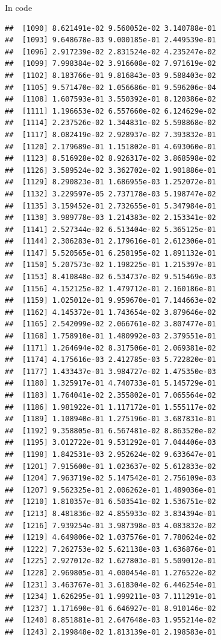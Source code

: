 \documentclass[ignorenonframetext,]{beamer}
\begin{document}
\begin{frame}[fragile]{In code}
\begin{verbatim}
##  [1090] 8.621491e-02 9.560052e-02 3.140788e-01
##  [1093] 9.648678e-03 9.000185e-01 2.449539e-01
##  [1096] 2.917239e-02 2.831524e-02 4.235247e-02
##  [1099] 7.998384e-02 3.916608e-02 7.971619e-02
##  [1102] 8.183766e-01 9.816843e-03 9.588403e-02
##  [1105] 9.571470e-02 1.056686e-01 9.596206e-04
##  [1108] 1.607593e-01 3.550392e-01 8.120386e-02
##  [1111] 1.196653e-02 6.557660e-02 6.124629e-02
##  [1114] 2.237526e-02 1.344831e-02 5.598868e-02
##  [1117] 8.082419e-02 2.928937e-02 7.393832e-01
##  [1120] 2.179689e-01 1.151802e-01 4.693060e-01
##  [1123] 8.516928e-02 8.926317e-02 3.868598e-02
##  [1126] 3.589524e-02 3.362702e-02 1.901886e-01
##  [1129] 8.290823e-01 1.686955e-03 1.252072e-01
##  [1132] 3.229597e-05 2.737178e-03 5.198747e-02
##  [1135] 3.159452e-01 2.732655e-01 5.347984e-01
##  [1138] 3.989778e-03 1.214383e-02 2.153341e-02
##  [1141] 2.527344e-02 6.513404e-02 5.365125e-01
##  [1144] 2.306283e-01 2.179616e-01 2.612306e-01
##  [1147] 5.520565e-01 6.258195e-02 1.891132e-01
##  [1150] 5.207573e-02 1.198225e-01 1.215397e-01
##  [1153] 8.410848e-02 6.534737e-02 9.515469e-03
##  [1156] 4.152125e-02 1.479712e-01 2.160186e-01
##  [1159] 1.025012e-01 9.959670e-01 7.144663e-02
##  [1162] 4.145372e-01 1.743654e-02 3.879646e-02
##  [1165] 2.542099e-02 2.066761e-02 3.807477e-01
##  [1168] 1.758910e-01 1.480992e-03 2.379551e-01
##  [1171] 1.264694e-02 8.317506e-01 2.069381e-02
##  [1174] 4.175616e-03 2.412785e-03 5.722820e-01
##  [1177] 1.433437e-01 3.984727e-02 1.475350e-03
##  [1180] 1.325917e-01 4.740733e-01 5.145729e-01
##  [1183] 1.764041e-02 2.355802e-01 7.065564e-02
##  [1186] 1.981922e-01 1.117172e-01 1.555117e-02
##  [1189] 1.108940e-01 1.275196e-01 3.687831e-01
##  [1192] 9.358805e-01 6.567481e-02 8.863520e-02
##  [1195] 3.012722e-01 9.531292e-01 7.044406e-03
##  [1198] 1.842531e-03 2.952624e-02 9.633647e-01
##  [1201] 7.915600e-01 1.023637e-02 5.612833e-02
##  [1204] 7.963719e-02 5.147542e-01 2.756109e-03
##  [1207] 9.562325e-01 2.006262e-01 1.489036e-01
##  [1210] 1.810357e-01 6.503541e-02 1.536751e-02
##  [1213] 8.481836e-02 4.855933e-02 3.834394e-01
##  [1216] 7.939254e-01 3.987398e-03 4.083832e-02
##  [1219] 4.649806e-02 1.037576e-01 7.780624e-02
##  [1222] 7.262753e-02 5.621138e-03 1.636876e-01
##  [1225] 2.927012e-02 1.627803e-01 5.509012e-01
##  [1228] 2.969805e-01 4.000454e-01 1.276522e-02
##  [1231] 3.463767e-01 3.618304e-02 6.446254e-01
##  [1234] 1.626295e-01 1.999211e-03 7.111291e-01
##  [1237] 1.171690e-01 6.646927e-01 8.910146e-02
##  [1240] 8.851881e-01 2.647648e-03 1.955214e-02
##  [1243] 2.199848e-02 1.813139e-01 2.198583e-01

\end{verbatim}
\end{frame}
\end{document}

